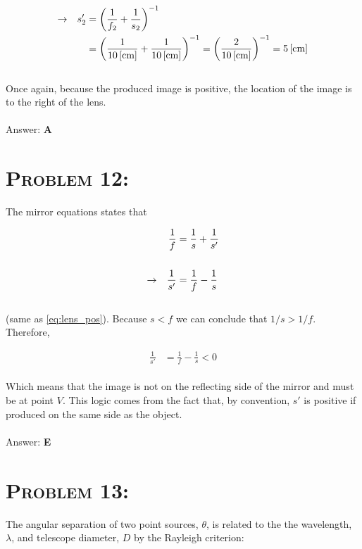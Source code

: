 \documentclass{article}
\begin{document}
\begin{align}
\rightarrow \hspace{.1in} s_{2}' &= \left(   \frac{1}{f_{2}} + \frac{1}{s_{2}}   \right)^{-1}\nonumber\\
&= \left(   \frac{1}{\unit[10]{[cm]}} + \frac{1}{\unit[10]{[cm]}}   \right)^{-1} = \left(   \frac{2}{\unit[10]{[cm]}} \right)^{-1}  = \unit[5]{[cm]}\nonumber
\end{align}
\\
Once again, because the produced image is positive, the location of the image is to the right of the lens.
\\\\
Answer: \textbf{\textcolor{ProcessBlue}A}\\


\section{\textsc{Problem 12:}} The mirror equations states that

\begin{align}
\frac{1}{f} &= \frac{1}{s} + \frac{1}{s'}\\
\nonumber\\
\rightarrow  \hspace{.1in} \frac{1}{s'} &= \frac{1}{f}  - \frac{1}{s} \nonumber
\end{align}
\\
(same as \ref{eq:lens_pos}). Because $s < f$ we can conclude that $1/s > 1/f$. Therefore,

\begin{align}
\frac{1}{s'} &= \frac{1}{f}  - \frac{1}{s}  < 0\nonumber
\end{align}
\\
Which means that the image is not on the reflecting side of the mirror and must be at point $V$. This logic comes from the fact that, by convention, $s'$ is positive if produced on the same side as the object.
\\\\
Answer: \textbf{\textcolor{ProcessBlue}E}\\


\section{\textsc{Problem 13:}} The angular separation of two point sources, $\theta$, is related to the the wavelength, $\lambda$, and telescope diameter, $D$ by the Rayleigh criterion:
\end{document}
